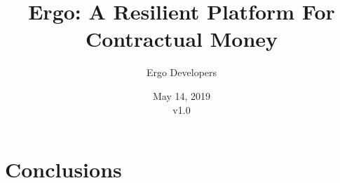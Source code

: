 \documentclass[]{article}
\begin{document}
    \title{Ergo: A Resilient Platform For Contractual Money}
    \author{Ergo Developers}

    \date{May 14, 2019\\v1.0}

    \maketitle

    

    

    

    

    

    

    

    

    \section{Conclusions}
    \label{sec:conclusions}

    
\end{document}
